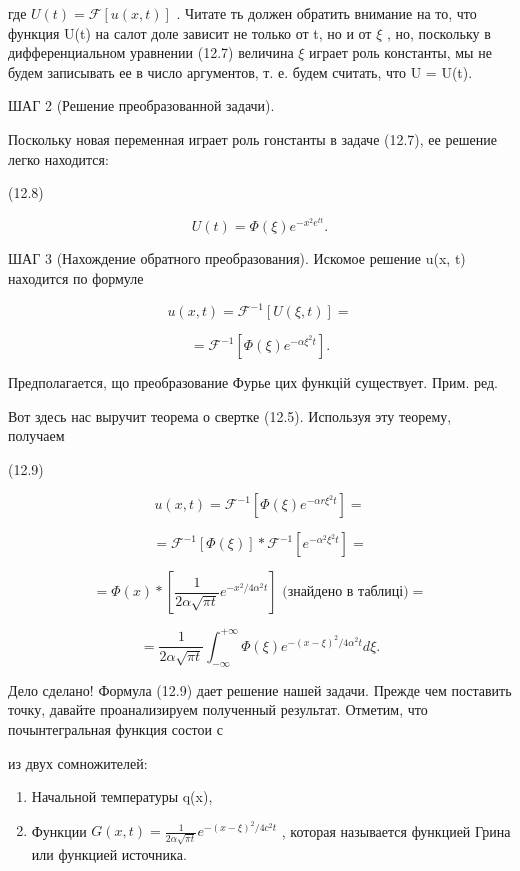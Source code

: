 \documentclass[
  ukrainian,
]{article}
\begin{document}
где \(U(t) = \mathcal{F}[u(x, t)]\) . Читате ть должен обратить внимание
на то, что функция U(t) на салот доле зависит не только от t, но и от
\(\xi\) , но, поскольку в дифференциальном уравнении (12.7) величина
\(\xi\) играет роль константы, мы не будем записывать ее в число
аргументов, т. е. будем считать, что U = U(t).

ШАГ 2 (Решение преобразованной задачи).

Поскольку новая переменная играет роль гонстанты в задаче (12.7), ее
решение легко находится:

(12.8)

\[
U(t) = \Phi(\xi) e^{-x^2 e^{tt}}.
\]

ШАГ 3 (Нахождение обратного преобразования). Искомое решение u(x, t)
находится по формуле

\[
u(x, t) = \mathcal{F}^{-1} [U(\xi, t)] =
\]

\[
= \mathcal{F}^{-1} [\Phi(\xi) e^{-\alpha \xi^2 t}].
\]

Предполагается, що преобразование Фурье цих функцій существует. Прим.
ред.

Вот здесь нас выручит теорема о свертке (12.5). Используя эту теорему,
получаем

(12.9)

\[
u(x, t) = \mathcal{F}^{-1} \left[ \Phi(\xi) e^{-\alpha r \xi^{2} t} \right] =
\]

\[
= \mathcal{F}^{-1} \left[ \Phi(\xi) \right] * \mathcal{F}^{-1} \left[ e^{-\alpha^{2} \xi^{2} t} \right] =
\]

\[
= \Phi(x) * \left[ \frac{1}{2\alpha \sqrt{\pi t}} e^{-x^{2}/4\alpha^{2} t} \right] \text{ (знайдено в таблиці)} =
\]

\[
= \frac{1}{2\alpha \sqrt{\pi t}} \int_{-\infty}^{+\infty} \Phi(\xi) e^{-(x-\xi)^{2}/4\alpha^{2} t} d\xi.
\]

Дело сделано! Формула (12.9) дает решение нашей задачи. Прежде чем
поставить точку, давайте проанализируем полученный результат. Отметим,
что почынтегральная функция состои с

из двух сомножителей:

\begin{enumerate}
\def\labelenumi{\arabic{enumi}.}
\item
  Начальной температуры q(x),
\item
  Функции
  \(G(x, t) = \frac{1}{2\alpha \sqrt{\pi t}} e^{-(x-\xi)^2/4c^2t}\) ,
  которая называется функцией Грина или функцией источника.
\end{enumerate}
\end{document}
